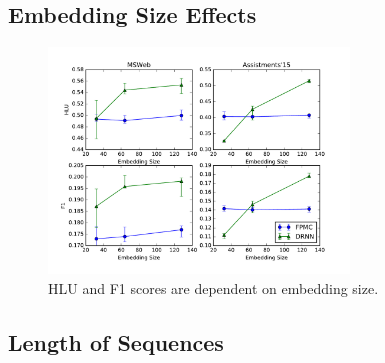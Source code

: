 \documentclass{sig-alternate-05-2015}
\begin{document}
\subsection{Embedding Size Effects}
\begin{figure}
\includegraphics[width=8cm]{images/EmbPerf}		
\caption{HLU and F1 scores are dependent on embedding size.}
\label{fig:EmbResults}
\end{figure}
\subsection{Length of Sequences}

%
\end{document}
